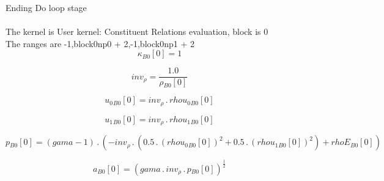 \documentclass{article}
\begin{document}
\noindent Ending Do loop stage\\
\\\noindent The kernel is User kernel: Constituent Relations evaluation, block is 0\\\noindent The ranges are -1,block0np0 + 2,-1,block0np1 + 2\\\begin{dmath}{\kappa{_{B0}}}[{0}] = 1\end{dmath}

\begin{dmath}inv_{\rho} = \frac{1.0}{{\rho{_{B0}}}[{0}]}\end{dmath}

\begin{dmath}{u_{0}{_{B0}}}[{0}] = inv_{\rho} \,.\, {rhou_{0}{_{B0}}}[{0}]\end{dmath}

\begin{dmath}{u_{1}{_{B0}}}[{0}] = inv_{\rho} \,.\, {rhou_{1}{_{B0}}}[{0}]\end{dmath}

\begin{dmath}{p{_{B0}}}[{0}] = \left(gama - 1\right) \,.\, \left(- inv_{\rho} \,.\, \left(0.5 \,.\, \left({rhou_{0}{_{B0}}}[{0}] \right)^{2} + 0.5 \,.\, \left({rhou_{1}{_{B0}}}[{0}] \right)^{2}\right) + {rhoE{_{B0}}}[{0}]\right)\end{dmath}

\begin{dmath}{a{_{B0}}}[{0}] = \left(gama \,.\, inv_{\rho} \,.\, {p{_{B0}}}[{0}] \right)^{\frac{1}{2}}\end{dmath}
\end{document}

